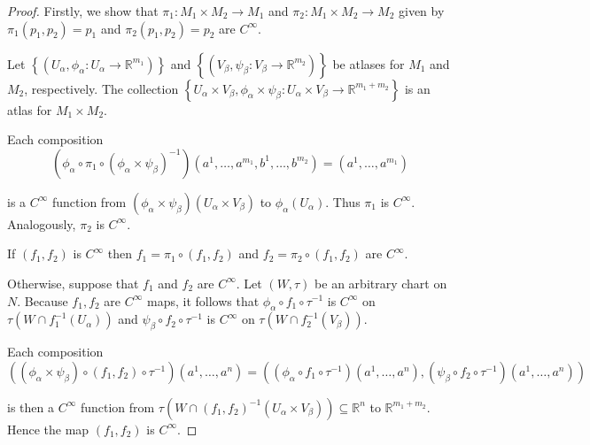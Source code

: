 \begin{proof}
	Firstly, we show that \( \pi_{1}: M_{1} \times M_{2} \to M_{1} \) and \( \pi_{2}: M_{1} \times M_{2} \to M_{2} \) given by \( \pi_{1}(p_{1}, p_{2}) = p_{1} \) and \( \pi_{2}(p_{1}, p_{2}) = p_{2} \) are \( C^{\infty} \).

	Let \( \left\{ (U_{\alpha}, \phi_{\alpha}: U_{\alpha} \to \mathbb{R}^{m_{1}}) \right\} \) and \( \left\{ (V_{\beta}, \psi_{\beta}: V_{\beta} \to \mathbb{R}^{m_{2}}) \right\} \) be atlases for \( M_{1} \) and \( M_{2} \), respectively. The collection \( \left\{ U_{\alpha} \times V_{\beta}, \phi_{\alpha} \times \psi_{\beta}: U_{\alpha} \times V_{\beta} \to \mathbb{R}^{m_{1} + m_{2}} \right\} \) is an atlas for \( M_{1} \times M_{2} \).

	Each composition
	\[
		(\phi_{\alpha} \circ \pi_{1}\circ {(\phi_{\alpha} \times \psi_{\beta})}^{-1})(a^{1}, \ldots, a^{m_{1}}, b^{1}, \ldots, b^{m_{2}}) = (a^{1}, \ldots, a^{m_{1}})
	\]

	is a \( C^{\infty} \) function from \( (\phi_{\alpha} \times \psi_{\beta})(U_{\alpha} \times V_{\beta}) \) to \( \phi_{\alpha}(U_{\alpha}) \). Thus \( \pi_{1} \) is \( C^{\infty} \). Analogously, \( \pi_{2} \) is \( C^{\infty} \).

	If \( (f_{1}, f_{2}) \) is \( C^{\infty} \) then \( f_{1} = \pi_{1} \circ (f_{1}, f_{2}) \) and \( f_{2} = \pi_{2} \circ (f_{1}, f_{2}) \) are \( C^{\infty} \).

	Otherwise, suppose that \( f_{1} \) and \( f_{2} \) are \( C^{\infty} \). Let \( (W, \tau) \) be an arbitrary chart on \( N \). Because \( f_{1}, f_{2} \) are  \( C^{\infty} \) maps, it follows that \( \phi_{\alpha} \circ f_{1}\circ \tau^{-1} \) is \( C^{\infty} \) on \( \tau(W \cap f_{1}^{-1}(U_{\alpha})) \) and \( \psi_{\beta} \circ f_{2} \circ \tau^{-1} \) is \( C^{\infty} \) on \( \tau(W \cap f_{2}^{-1}(V_{\beta})) \).

	Each composition
	\[
		((\phi_{\alpha} \times \psi_{\beta}) \circ (f_{1}, f_{2}) \circ \tau^{-1})(a^{1}, \ldots, a^{n}) = ((\phi_{\alpha} \circ f_{1} \circ \tau^{-1})(a^{1}, \ldots, a^{n}), (\psi_{\beta} \circ f_{2} \circ \tau^{-1})(a^{1}, \ldots, a^{n}))
	\]

	is then a \( C^{\infty} \) function from \( \tau(W \cap {(f_{1}, f_{2})}^{-1}(U_{\alpha} \times V_{\beta})) \subseteq \mathbb{R}^{n} \) to \( \mathbb{R}^{m_{1} + m_{2}} \). Hence the map \( (f_{1}, f_{2}) \) is \( C^{\infty} \).
\end{proof}

